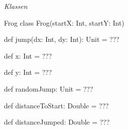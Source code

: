 \ExtraTasks %


\Task \emph{Klassen } 

\Subtask 

\begin{ScalaSpec}{Frog}
class Frog(startX: Int, startY: Int) {

  def jump(dx: Int, dy: Int): Unit = ???

  def x: Int = ??? 
  
  def y: Int = ???
 
  def randomJump: Unit = ???
  
  def distanceToStart: Double = ???
  
  def distanceJumped: Double = ???
}

\end{ScalaSpec}

\AdvancedTasks %

\Task     
    